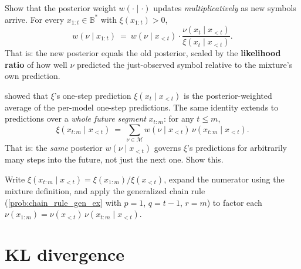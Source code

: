 \documentclass[fontsize=11pt, parskip=half]{scrartcl}
\newcommand{\Mc}{\mathcal{M}}
\begin{document}
\begin{exercise}
\label{prob:posterior_update_ex}



Show that the posterior weight $w(\cdot \mid \cdot)$ updates \emph{multiplicatively} as new symbols arrive. For every $x_{1:t} \in \mathbb{B}^*$ with $\xi(x_{1:t}) > 0$,
\[
  w(\nu \mid x_{1:t}) ~=~ w(\nu \mid x_{<t}) \cdot \frac{\nu(x_t \mid x_{<t})}{\xi(x_t \mid x_{<t})}.
\]
That is: the new posterior equals the old posterior, scaled by the \textbf{likelihood ratio} of how well $\nu$ predicted the just-observed symbol relative to the mixture's own prediction.
\end{exercise}


\begin{exercise}
\label{prob:multi_step_xi_ex}



 showed that $\xi$'s one-step prediction $\xi(x_t \mid x_{<t})$ is the posterior-weighted average of the per-model one-step predictions. The same identity extends to predictions over a \emph{whole future segment} $x_{t:m}$: for any $t \leq m$,
\[
  \xi(x_{t:m} \mid x_{<t}) ~=~ \sum_{\nu \in \Mc} w(\nu \mid x_{<t})\, \nu(x_{t:m} \mid x_{<t}).
\]
That is: the \emph{same} posterior $w(\nu \mid x_{<t})$ governs $\xi$'s predictions for arbitrarily many steps into the future, not just the next one. Show this.

\begin{hint}
Write $\xi(x_{t:m} \mid x_{<t}) = \xi(x_{1:m}) / \xi(x_{<t})$, expand the numerator using the mixture definition, and apply the generalized chain rule (\cref{prob:chain_rule_gen_ex} with $p=1$, $q=t-1$, $r=m$) to factor each $\nu(x_{1:m}) = \nu(x_{<t})\,\nu(x_{t:m} \mid x_{<t})$.
\end{hint}
\end{exercise}


\section{KL divergence}\label{prob:chain_rule}
\end{document}
